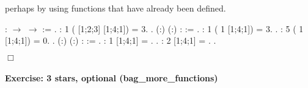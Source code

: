 \documentclass[12pt]{report}
\begin{document}
    perhaps by using functions that have already been defined.  \begin{coqdoccode}
\coqdocemptyline
\coqdocnoindent
{}  :  \ensuremath{\rightarrow}  \ensuremath{\rightarrow}  := \coqdoceol
\coqdocindent{1.00em}
 .\coqdoceol
\coqdocemptyline
\coqdocnoindent
{} :               1 ( [1;2;3] [1;4;1]) = 3.\coqdoceol
 .\coqdoceol
\coqdocemptyline
\coqdocnoindent
{}  (:) (:) :  := \coqdoceol
\coqdocindent{1.00em}
 .\coqdoceol
\coqdocemptyline
\coqdocnoindent
{} :                 1 ( 1 [1;4;1]) = 3.\coqdoceol
 .\coqdoceol
\coqdocnoindent
{} :                 5 ( 1 [1;4;1]) = 0.\coqdoceol
 .\coqdoceol
\coqdocemptyline
\coqdocnoindent
{}  (:) (:) :  := \coqdoceol
\coqdocindent{1.00em}
 .\coqdoceol
\coqdocemptyline
\coqdocnoindent
{} :              1 [1;4;1] = .\coqdoceol
 .\coqdoceol
\coqdocnoindent
{} :              2 [1;4;1] = .\coqdoceol
 .\coqdoceol
\end{coqdoccode}
\ensuremath{\Box} 

\paragraph{Exercise: 3 stars, optional (bag\_more\_functions)}
\end{document}
